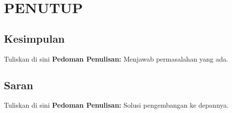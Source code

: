 \chapter{PENUTUP}
\section{Kesimpulan}


Tuliskan di sini \textbf{Pedoman Penulisan:} Menjawab permasalahan yang ada.


\section{Saran}


Tuliskan di sini \textbf{Pedoman Penulisan:} Solusi pengembangan ke depannya.


